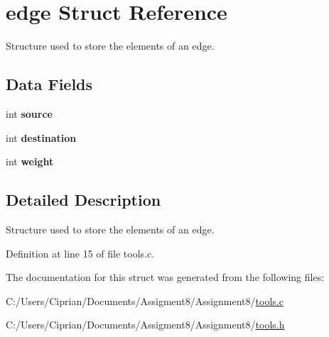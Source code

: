 \hypertarget{structedge}{}\section{edge Struct Reference}
\label{structedge}


Structure used to store the elements of an edge.  


\subsection*{Data Fields}
\begin{DoxyCompactItemize}
\item 
\mbox{\label{structedge_a07a87b2e6ed927503e2f95f119c9fc23}} 
int {\bfseries source}
\item 
\mbox{\label{structedge_a17744967a9eda456c21490b51b74917a}} 
int {\bfseries destination}
\item 
\mbox{\label{structedge_aa01147b1f07072d246c76dc85d69df7c}} 
int {\bfseries weight}
\end{DoxyCompactItemize}


\subsection{Detailed Description}
Structure used to store the elements of an edge. 

Definition at line 15 of file tools.\+c.



The documentation for this struct was generated from the following files\+:\begin{DoxyCompactItemize}
\item 
C\+:/\+Users/\+Ciprian/\+Documents/\+Assigment8/\+Assignment8/\mbox{\hyperlink{tools_8c}{tools.\+c}}\item 
C\+:/\+Users/\+Ciprian/\+Documents/\+Assigment8/\+Assignment8/\mbox{\hyperlink{tools_8h}{tools.\+h}}\end{DoxyCompactItemize}
